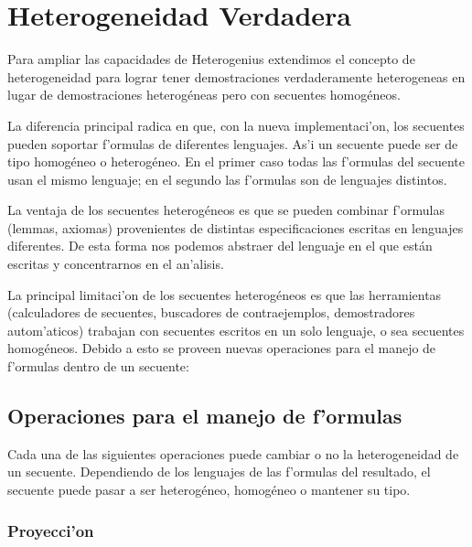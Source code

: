 \section{Heterogeneidad Verdadera}
\label{sec:heterogeneidad-verdadera}

Para ampliar las capacidades de Heterogenius extendimos el concepto de heterogeneidad para lograr tener demostraciones verdaderamente heterogeneas en lugar de demostraciones heterogéneas pero con secuentes homogéneos. 

La diferencia principal radica en que, con la nueva implementaci'on, los secuentes pueden soportar f'ormulas de diferentes lenguajes. As'i un secuente puede ser de tipo homogéneo o heterogéneo. En el primer caso todas las f'ormulas del secuente usan el mismo lenguaje; en el segundo las f'ormulas son de lenguajes distintos.

La ventaja de los secuentes heterogéneos es que se pueden combinar f'ormulas (lemmas, axiomas) provenientes de distintas especificaciones escritas en lenguajes diferentes. De esta forma nos podemos abstraer del lenguaje en el que están escritas y concentrarnos en el an'alisis.

La principal limitaci'on de los secuentes heterogéneos es que las herramientas (calculadores de secuentes, buscadores de contraejemplos, demostradores autom'aticos) trabajan con secuentes escritos en un solo lenguaje, o sea secuentes homogéneos. Debido a esto se proveen nuevas operaciones para el manejo de f'ormulas dentro de un secuente:

\subsection{Operaciones para el manejo de f'ormulas}

Cada una de las siguientes operaciones puede cambiar o no la heterogeneidad de un secuente.  Dependiendo de los lenguajes de las f'ormulas del resultado, el secuente puede pasar a ser heterogéneo, homogéneo o mantener su tipo.

\subsubsection{Proyecci'on}

